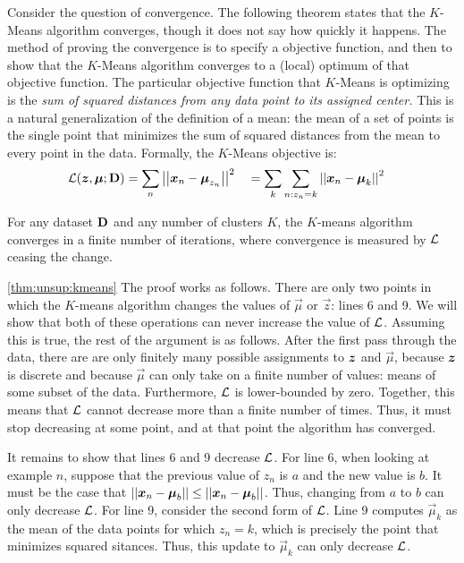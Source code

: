 Consider the question of convergence.  The following theorem states
that the $K$-Means algorithm converges, though it does not say how
quickly it happens.  The method of proving the convergence is to
specify a  objective function, and then to
show that the $K$-Means algorithm converges to a (local) optimum of
that objective function.  The particular objective function that
$K$-Means is optimizing is the \emph{sum of squared distances from any
  data point to its assigned center.}  This is a natural
generalization of the definition of a mean: the mean of a set of
points is the single point that minimizes the sum of squared distances
from the mean to every point in the data.  Formally, the $K$-Means
objective is:
%
\begin{align}
  \mathcal{L}(\boldsymbol{z}, \boldsymbol{\mu} ; \text{\bf D})
  &=
  \sum_n \left\vert\left\vert  {\boldsymbol{x}}_n - \boldsymbol{\mu}_{z_n}  \right\vert\right\vert^2
  \quad
  =
  \sum_k \sum_{n : z_n=k} \left\vert\left\vert  {\boldsymbol{x}}_n - \boldsymbol{\mu}_k  \right\vert\right\vert^2
\end{align}
%
\begin{theorem} \label{thm:unsup:kmeans}
  For any dataset $\text{\bf D}$ and any number of clusters $K$, the
  $K$-means algorithm converges in a finite number of iterations,
  where convergence is measured by $\mathcal{L}$ ceasing the change.
\end{theorem}
\begin{myproof}{\ref{thm:unsup:kmeans}}
    The proof works as follows.  There are only two points in which
    the $K$-means algorithm changes the values of $\vec\mu$ or $\vec
    z$: lines 6 and 9.  We will show that both of these operations
    can never increase the value of $\mathcal{L}$.  Assuming this is true, the
    rest of the argument is as follows.  After the first pass through
    the data, there are are only finitely many possible assignments to
    ${\boldsymbol{z}}$ and $\vec \mu$, because ${\boldsymbol{z}}$ is discrete and because
    $\vec\mu$ can only take on a finite number of values: means of
    some subset of the data.  Furthermore, $\mathcal{L}$ is lower-bounded by
    zero.  Together, this means that $\mathcal{L}$ cannot decrease more than a
    finite number of times.  Thus, it must stop decreasing at some
    point, and at that point the algorithm has converged.

    It remains to show that lines 6 and 9 decrease $\mathcal{L}$.  For line 6,
    when looking at example $n$, suppose that the previous value of
    $z_n$ is $a$ and the new value is $b$.  It must be the case that
    $\left\vert\left\vert {\boldsymbol{x}}_n-\boldsymbol{\mu}_b \right\vert\right\vert \leq \left\vert\left\vert {\boldsymbol{x}}_n-\boldsymbol{\mu}_b \right\vert\right\vert$.  Thus,
    changing from $a$ to $b$ can only decrease $\mathcal{L}$.  For line 9,
    consider the second form of $\mathcal{L}$.  Line 9 computes $\vec\mu_k$ as
    the mean of the data points for which $z_n=k$, which is precisely
    the point that minimizes squared sitances.  Thus, this update to
    $\vec\mu_k$ can only decrease $\mathcal{L}$.
\end{myproof}

